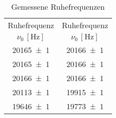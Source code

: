 \begin{table}[!h]
	\centering
	\begin{tabular}{|c||c|}
		\hline
		Ruhefrequenz & Ruhefrequenz\\
		$\nu_{0}\,[\si{\hertz}]$ & $\nu_{0}\,[\si{\hertz}]$\\\hline\hline
		\num{20165(1)} &\num{20166(1)} \\
		\num{20165(1)} &\num{20166(1)} \\
		\num{20166(1)} &\num{20166(1)} \\
		\num{20113(1)} &\num[color=red]{19915(1)} \\
		\num[color=red]{19646(1)} &\num[color=red]{19773(1)} \\
		
		
	
		
		
		
		
		\hline
	\end{tabular}
	\caption{Gemessene Ruhefrequenzen \label{tab:Auswertung_Ruhefrequenz}}
\end{table}